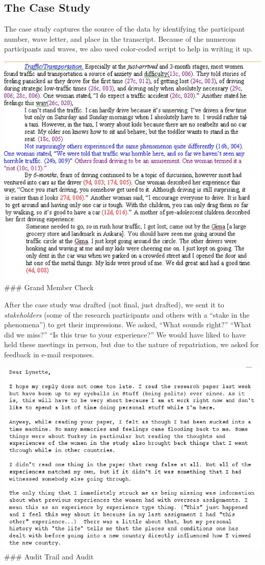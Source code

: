 \documentclass[
  english,
]{book}
\begin{document}
\hypertarget{the-case-study}{%
\subsection{The Case Study}\label{the-case-study}}

The case study captures the source of the data by identifying the participant number, wave letter, and place in the transcript. Because of the numerous participants and waves, we also used color-coded script to help in writing it up.

\includegraphics{images/Qualitative/case_report.jpg}
\#\#\# Grand Member Check

After the case study was drafted (not final, just drafted), we sent it to \emph{stakeholders} (some of the research participants and others with a ``stake in the phenomena'') to get their impressions. We asked, ``What sounds right?'' ``What did we miss?'' ``Is this true to your experience?'' We would have liked to have held these meetings in person, but due to the nature of repatriation, we asked for feedback in e-mail responses.

\includegraphics{images/Qualitative/MemberCheck.jpg}
\#\#\# Audit Trail and Audit
\end{document}
